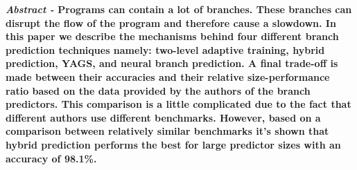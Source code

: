 \textbf{\textit{Abstract -} Programs can contain a lot of branches. These branches can disrupt the flow of the program and therefore cause a slowdown. In this paper we describe the mechanisms behind four different branch prediction techniques namely: two-level adaptive training, hybrid prediction, YAGS, and neural branch prediction. A final trade-off is made between their accuracies and their relative size-performance ratio based on the data provided by the authors of the branch predictors. This comparison is a little complicated due to the fact that different authors use different benchmarks. However, based on a comparison between relatively similar benchmarks it's shown that hybrid prediction performs the best for large predictor sizes with an accuracy of 98.1\%.}